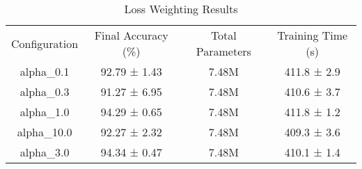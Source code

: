 \begin{table}
    \centering
    \begin{tabular}{cccc}
        Configuration & Final Accuracy (\%) & Total Parameters & Training Time (s) \\
        alpha_0.1 & 92.79 ± 1.43 & 7.48M & 411.8 ± 2.9 \\
        alpha_0.3 & 91.27 ± 6.95 & 7.48M & 410.6 ± 3.7 \\
        alpha_1.0 & 94.29 ± 0.65 & 7.48M & 411.8 ± 1.2 \\
        alpha_10.0 & 92.27 ± 2.32 & 7.48M & 409.3 ± 3.6 \\
        alpha_3.0 & 94.34 ± 0.47 & 7.48M & 410.1 ± 1.4 \\
    \end{tabular}
    \caption{Loss Weighting Results}
    \label{tab:alpha}
\end{table}
